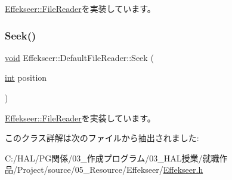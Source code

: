 \mbox{\hyperlink{class_effekseer_1_1_file_reader_a6274b775770e8ac9ba4f212c80e94be1}{Effekseer\+::\+File\+Reader}}を実装しています。

\mbox{\label{class_effekseer_1_1_default_file_reader_a9c9e821e4508708a2c91a9ab486b2709}} 
\subsubsection{\texorpdfstring{Seek()}{Seek()}}
{\footnotesize\ttfamily \mbox{\hyperlink{namespace_effekseer_ab34c4088e512200cf4c2716f168deb56}{void}} Effekseer\+::\+Default\+File\+Reader\+::\+Seek (\begin{DoxyParamCaption}\item[{\mbox{\hyperlink{namespace_effekseer_ace0abf7c2e6947e519ebe8b54cbcc30a}{int}}}]{position }\end{DoxyParamCaption})\hspace{0.3cm}{\ttfamily [virtual]}}



\mbox{\hyperlink{class_effekseer_1_1_file_reader_a5daeb98049f994bccf874b2374e36a25}{Effekseer\+::\+File\+Reader}}を実装しています。



このクラス詳解は次のファイルから抽出されました\+:\begin{DoxyCompactItemize}
\item 
C\+:/\+H\+A\+L/\+P\+G関係/03\+\_\+作成プログラム/03\+\_\+\+H\+A\+L授業/就職作品/\+Project/source/05\+\_\+\+Resource/\+Effekseer/\mbox{\hyperlink{_effekseer_8h}{Effekseer.\+h}}\end{DoxyCompactItemize}
